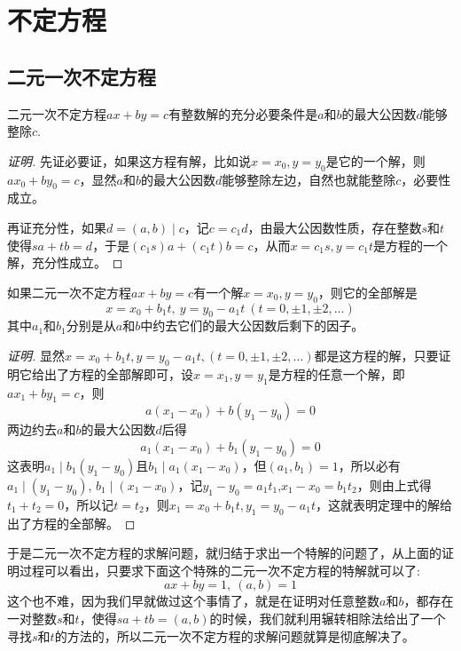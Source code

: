 
\section{不定方程}
\label{sec:indefinite-equation}

\subsection{二元一次不定方程}
\label{sec:indefinite-binary-equation-of-the-first-degree}

\begin{theorem}
  二元一次不定方程$ax+by=c$有整数解的充分必要条件是$a$和$b$的最大公因数$d$能够整除$c$.
\end{theorem}

\begin{proof}[证明]
  先证必要证，如果这方程有解，比如说$x=x_0,y=y_0$是它的一个解，则$ax_0+by_0=c$，显然$a$和$b$的最大公因数$d$能够整除左边，自然也就能整除$c$，必要性成立。

  再证充分性，如果$d=(a,b) \mid c$，记$c=c_1d$，由最大公因数性质，存在整数$s$和$t$使得$sa+tb=d$，于是$(c_1s)a+(c_1t)b=c$，从而$x=c_1s,y=c_1t$是方程的一个解，充分性成立。
\end{proof}

\begin{theorem}
  如果二元一次不定方程$ax+by=c$有一个解$x=x_0,y=y_0$，则它的全部解是
  \[ x=x_0+b_1t, \  y=y_0-a_1t \  (t=0, \pm 1, \pm 2, \ldots ) \]
  其中$a_1$和$b_1$分别是从$a$和$b$中约去它们的最大公因数后剩下的因子。
\end{theorem}

\begin{proof}[证明]
  显然$x=x_0+b_1t,y=y_0-a_1t,(t=0, \pm 1, \pm 2, \ldots)$都是这方程的解，只要证明它给出了方程的全部解即可，设$x=x_1,y=y_1$是方程的任意一个解，即$ax_1+by_1=c$，则
  \[ a(x_1-x_0)+b(y_1-y_0)=0 \]
  两边约去$a$和$b$的最大公因数$d$后得
  \[ a_1(x_1-x_0)+b_1(y_1-y_0)=0 \]
  这表明$a_1 \mid b_1(y_1-y_0)$且$b_1 \mid a_1(x_1-x_0)$，但$(a_1,b_1)=1$，所以必有$a_1 \mid (y_1-y_0)$, $b_1 \mid (x_1-x_0)$，记$y_1-y_0=a_1t_1$,$x_1-x_0=b_1t_2$，则由上式得$t_1+t_2=0$，所以记$t=t_2$，则$x_1=x_0+b_1t,y_1=y_0-a_1t$，这就表明定理中的解给出了方程的全部解。
\end{proof}

于是二元一次不定方程的求解问题，就归结于求出一个特解的问题了，从上面的证明过程可以看出，只要求下面这个特殊的二元一次不定方程的特解就可以了:
\[ ax+by=1, \  (a,b)=1 \]
这个也不难，因为我们早就做过这个事情了，就是在证明对任意整数$a$和$b$，都存在一对整数$s$和$t$，使得$sa+tb=(a,b)$的时候，我们就利用辗转相除法给出了一个寻找$s$和$t$的方法的，所以二元一次不定方程的求解问题就算是彻底解决了。

